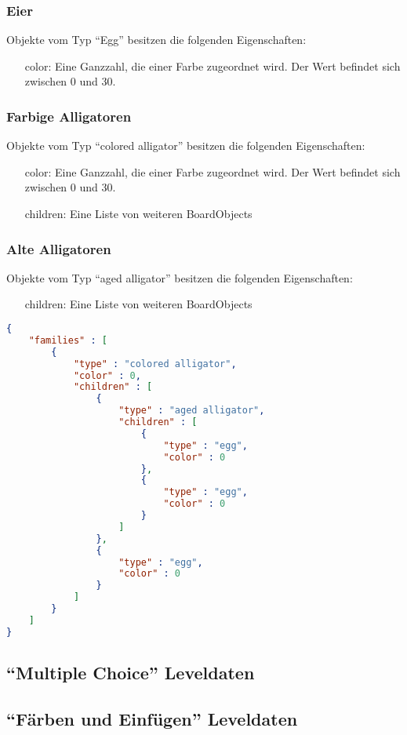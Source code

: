\subsubsection{Eier}
Objekte vom Typ "`Egg"' besitzen die folgenden Eigenschaften:
\begin{itemize}
	\item[color:] Eine Ganzzahl, die einer Farbe zugeordnet wird. Der Wert befindet sich zwischen 0 und 30.
\end{itemize}

\subsubsection{Farbige Alligatoren}
Objekte vom Typ "`colored alligator"' besitzen die folgenden Eigenschaften:
\begin{itemize}
	\item[color:] Eine Ganzzahl, die einer Farbe zugeordnet wird. Der Wert befindet sich zwischen 0 und 30.
	\item[children:] Eine Liste von weiteren BoardObjects
\end{itemize}

\subsubsection{Alte Alligatoren}
Objekte vom Typ "`aged alligator"' besitzen die folgenden Eigenschaften:
\begin{itemize}
	\item[children:] Eine Liste von weiteren BoardObjects
\end{itemize}

\begin{lstlisting}[language=json,caption={Ein einfaches Board mit allen existierenden BoardObjects}]
{
	"families" : [
		{
			"type" : "colored alligator",
			"color" : 0,
			"children" : [
				{
					"type" : "aged alligator",
					"children" : [
						{
							"type" : "egg",
							"color" : 0
						},
						{
							"type" : "egg",
							"color" : 0
						}
					]
				},
				{
					"type" : "egg",
					"color" : 0
				}
			]
		}
	]
}
\end{lstlisting}

\subsection{"`Multiple Choice"' Leveldaten}

\subsection{"`Färben und Einfügen"' Leveldaten}

